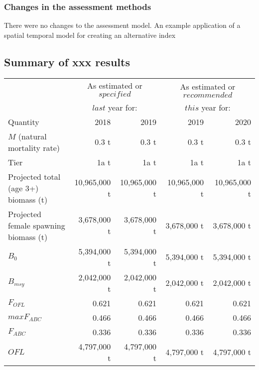 \documentclass[11pt,]{article}
\begin{document}
\hypertarget{changes-in-the-assessment-methods}{%
\subsubsection{Changes in the assessment
methods}\label{changes-in-the-assessment-methods}}

There were no changes to the assessment model. An example application of
a spatial temporal model for creating an alternative index

\hypertarget{summary-of-xxx-results}{%
\subsection{Summary of xxx results}\label{summary-of-xxx-results}}

\begin{table}[ht]
\centering
\begin{tabular}{lrr|rr}
  \hline
       & \multicolumn{2}{c|}{As estimated or $\mathit{specified}$ } & \multicolumn{2}{c}{As estimated or $\mathit{recommended}$ }  \\
       & \multicolumn{2}{c|}{$\mathit{last}$ year for:}  & \multicolumn{2}{c}{$\mathit{this}$ year for: }               \\
        Quantity & 2018      &2019   & 2019      &2020 \\ 
  \hline
$M$ (natural mortality rate)          &  0.3 t &  0.3 t &  0.3 t & 0.3 t \\
Tier                                  &  1a t &  1a t &  1a t & 1a t \\
Projected total (age 3+) biomass (t)  &  10,965,000 t &  10,965,000 t &  10,965,000 t & 10,965,000 t \\
Projected female spawning biomass (t) &  3,678,000 t &  3,678,000 t &  3,678,000 t & 3,678,000 t \\
$B_0$                                 &  5,394,000 t &  5,394,000 t &  5,394,000 t & 5,394,000 t \\
$B_{msy}$                             &  2,042,000 t &  2,042,000 t &  2,042,000 t & 2,042,000 t \\
$F_{OFL}$                             &  0.621   &  0.621   &  0.621   & 0.621   \\
$maxF_{ABC}$                          &  0.466   &  0.466   &  0.466   & 0.466   \\
$F_{ABC}$                             &  0.336   &  0.336   &  0.336   & 0.336   \\
$OFL$                                 &  4,797,000 t &  4,797,000 t &  4,797,000 t & 4,797,000 t \\

\end{tabular}
\end{table}
\end{document}
